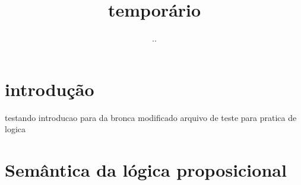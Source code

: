 \documentclass{article}
\title{temporário}
\author{..}
\begin{document}
\maketitle

\section{introdução}

testando introducao para da bronca
modificado
arquivo de teste para pratica de logica

\section{Semântica da lógica proposicional}
\end{document}
